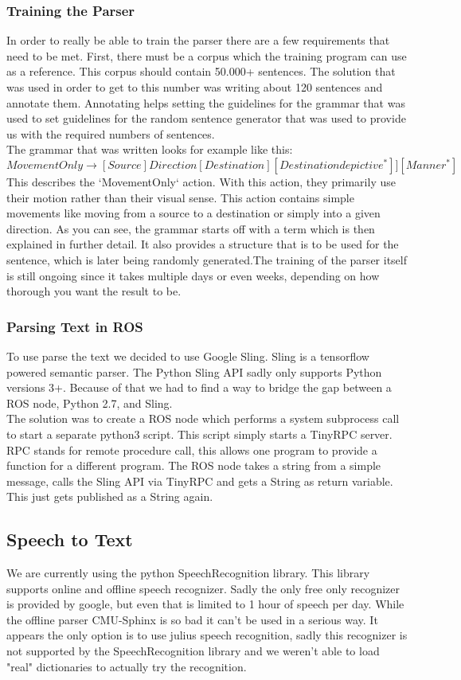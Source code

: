 \documentclass[main.tex]{subfiles}
\begin{document}
		\subsubsection{Training the Parser}
		In order to really be able to train the parser there are a few requirements that need to be met. First, there must be a corpus which the training program can use as a reference. This corpus should contain 50.000+ sentences. The solution that was used in order to get to this number was writing about 120 sentences and annotate them. Annotating helps setting the guidelines for the grammar that was used to set guidelines for the random sentence generator that was used to provide us with the required numbers of sentences.\\
		The grammar that was written looks for example like this:
		\begin{equation}
		MovementOnly \rightarrow [Source]Direction[Destination][Destinationdepictive^*]][Manner^*]
		\end{equation}		
		This describes the ‘MovementOnly‘ action. With this action, they primarily use their motion rather than their visual sense. This action contains simple movements like moving from a source to a destination or simply into a given direction.
		As you can see, the grammar starts off with a term which is then explained in further detail. It also provides a structure that is to be used for the sentence, which is later being randomly generated.The training of the parser itself is still ongoing since it takes multiple days or even weeks, depending on how thorough you want the result to be.
		
		\subsubsection{Parsing Text in ROS}
		To use parse the text we decided to use Google Sling. Sling is a tensorflow powered semantic parser. The Python Sling API sadly only supports Python versions 3+. Because of that we had to find a way to bridge the gap between a ROS node, Python 2.7, and Sling.\\
		The solution was to create a ROS node which performs a system subprocess call to start a separate python3 script. This script simply starts a TinyRPC server. RPC stands for remote procedure call, this allows one program to provide a function for a different program. The ROS node takes a string from a simple message, calls the Sling API via TinyRPC and gets a String as return variable. This just gets published as a String again.
		
		\subsection{Speech to Text}
		We are currently using the python SpeechRecognition library. This library supports online and offline speech recognizer. Sadly the only free only recognizer is provided by google, but even that is limited to 1 hour of speech per day. While the offline parser CMU-Sphinx is so bad it can't be used in a serious way.
		It appears the only option is to use julius speech recognition, sadly this recognizer is not supported by the SpeechRecognition library and we weren't able to load "real" dictionaries to actually try the recognition.
	
\end{document}
